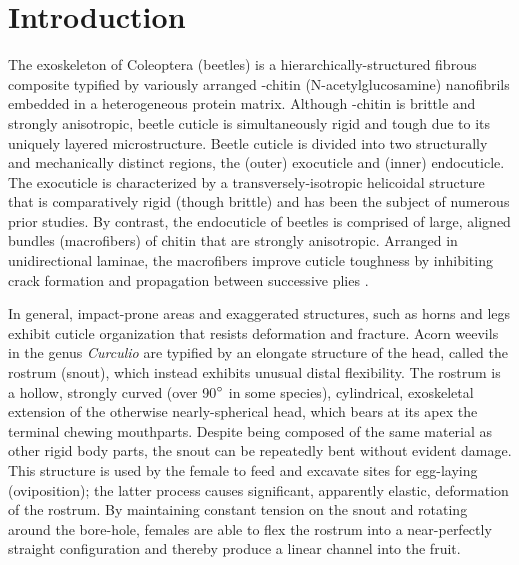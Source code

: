 \documentclass[twocolumn, linenumbers, superscriptaddress]{revtex4-1}
\begin{document}
\section*{Introduction} 
	{The exoskeleton of Coleoptera (beetles) is a hierarchically-structured fibrous composite typified by variously arranged \textalpha-chitin (N-acetylglucosamine) nanofibrils embedded in a heterogeneous protein matrix.
	Although \textalpha-chitin is brittle and strongly anisotropic, beetle cuticle is simultaneously rigid and tough due to its uniquely layered microstructure.
	Beetle cuticle is divided into two structurally and mechanically distinct regions, the (outer) exocuticle and (inner) endocuticle.
	The exocuticle is characterized by a transversely-isotropic helicoidal structure that is comparatively rigid (though brittle) and has been the subject of numerous prior studies.
	By contrast, the endocuticle of beetles is comprised of large, aligned bundles (macrofibers) of chitin that are strongly anisotropic.
	Arranged in unidirectional laminae, the macrofibers improve cuticle toughness by inhibiting crack formation and propagation between successive plies \cite{Kamp2010,Kamp2015,Hepburn1973}.
	
	In general, impact-prone areas and exaggerated structures, such as horns and legs exhibit cuticle organization that resists deformation and fracture.
	Acorn weevils in the genus \textit{Curculio} are typified by an elongate structure of the head, called the rostrum (snout), which instead exhibits unusual distal flexibility.
	The rostrum is a hollow, strongly curved (over 90$\degree$ in some species), cylindrical, exoskeletal extension of the otherwise nearly-spherical head, which bears at its apex the terminal chewing mouthparts.
	Despite being composed of the same material as other rigid body parts, the snout can be repeatedly bent without evident damage.
	This structure is used by the female to feed and excavate sites for egg-laying (oviposition); the latter process causes significant, apparently elastic, deformation of the rostrum.
	By maintaining constant tension on the snout and rotating around the bore-hole, females are able to flex the rostrum into a near-perfectly straight configuration and thereby produce a linear channel into the fruit.
	
}
\end{document}
